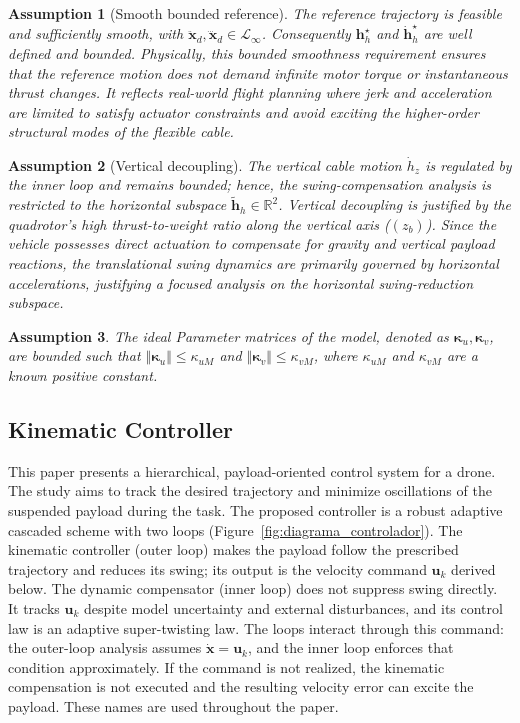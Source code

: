 \documentclass[sn-mathphys-num]{sn-jnl}
\newtheorem{assumption}{Assumption}
\theoremstyle{thmstyleone}%
\theoremstyle{thmstyletwo}%
\theoremstyle{thmstylethree}%
\begin{document}
\begin{assumption}[Smooth bounded reference]\label{as:reference}
The reference trajectory is feasible and sufficiently smooth, with
$\ddot{\mathbf{x}}_d,\dddot{\mathbf{x}}_d\in\mathcal{L}_\infty$. Consequently
$\mathbf{h}_h^\star$ and $\dot{\mathbf{h}}_h^\star$ are well defined and bounded. Physically, this bounded smoothness requirement ensures that the reference motion does not demand infinite motor torque or instantaneous thrust changes. It reflects real-world flight planning where jerk and acceleration are limited to satisfy actuator constraints and avoid exciting the higher-order structural modes of the flexible cable.
\end{assumption}

\begin{assumption}[Vertical decoupling]\label{as:vertical}
The vertical cable motion $\dot{h}_z$ is regulated by the inner loop and remains
bounded; hence, the swing-compensation analysis is restricted to the horizontal
subspace $\tilde{\mathbf{h}}_h\in\mathbb{R}^2$. Vertical decoupling is justified by the quadrotor’s high thrust-to-weight ratio along the vertical axis ($(z_b)$). Since the vehicle possesses direct actuation to compensate for gravity and vertical payload reactions, the translational swing dynamics are primarily governed by horizontal accelerations, justifying a focused analysis on the horizontal swing-reduction subspace.
\end{assumption}

\begin{assumption}\label{as:parameters}
The ideal Parameter matrices of the model, denoted as $\boldsymbol{\kappa}_u,\boldsymbol{\kappa}_v$, are bounded such that $ \Vert{}\boldsymbol{\kappa}_u\Vert{} \leq \kappa_{uM} $ and $\Vert{}\boldsymbol{\kappa}_v\Vert{} \leq \kappa_{vM}$, where $ \kappa_{uM} $ and $ \kappa_{vM} $ are a known positive constant.
\end{assumption}

\subsection{Kinematic Controller}\label{sec:kinematic}

This paper presents a hierarchical, payload-oriented control system for a drone. The study aims to track the desired trajectory and minimize oscillations of the suspended payload during the task. The proposed controller is a robust adaptive cascaded scheme with two loops (Figure~\ref{fig:diagrama_controlador}). The kinematic controller (outer loop) makes the payload follow the prescribed trajectory and reduces its swing; its output is the velocity command \(\mathbf{u}_k\) derived below. The dynamic compensator (inner loop) does not suppress swing directly. It tracks \(\mathbf{u}_k\) despite model uncertainty and external disturbances, and its control law is an adaptive super-twisting law. The loops interact through this command: the outer-loop analysis assumes \(\dot{\mathbf{x}}=\mathbf{u}_k\), and the inner loop enforces that condition approximately. If the command is not realized, the kinematic compensation is not executed and the resulting velocity error can excite the payload. These names are used throughout the paper.
\end{document}

